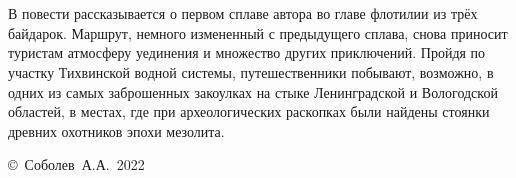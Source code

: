 \chapter*{}

В повести рассказывается о первом сплаве автора во главе флотилии из трёх байдарок. Маршрут, немного измененный с предыдущего сплава, снова приносит туристам атмосферу уединения и множество других приключений. Пройдя по участку Тихвинской водной системы, путешественники побывают, возможно, в одних из самых заброшенных закоулках на стыке Ленинградской и Вологодской областей, в местах, где при археологических раскопках были найдены стоянки древних охотников эпохи мезолита.

\vspace{\fill}
\begin{flushright}
	\copyright~Соболев~А.А.~2022
\end{flushright}